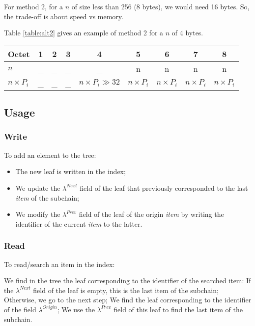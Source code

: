 \documentclass[twoside,twocolumn]{article}
\theoremstyle{definition}
\theoremstyle{remark}
\begin{document}
For method 2, for a $n$ of size less than 256 (8 bytes), we would need 16 bytes. So, the trade-off is about speed vs memory.

Table \ref{table:alt2} gives an example of method 2 for a $n$ of 4 bytes.
\begin{table*}
    \centering
    \caption{Memory management}
    \begin{tabular*}{0.75\textwidth}{l|c|c|c|c|c|c|c|c}
        Octet           &   1   &   2   &   3   &           4           &       5           &       6           &       7           &       8 \\
        \hline \hline
        $n$             &   \_  &   \_  &   \_  &           \_          &       n           &       n           &       n           &       n \\
        \hline
        $n \times P_i$  &   \_  &   \_  &   \_  & $n \times P_i \gg 32$ & $n \times P_i$    & $n \times P_i$    & $n \times P_i$    & $n \times P_i$
        \label{table:alt2}
    \end{tabular*}
\end{table*}

\subsection{Usage}

\subsubsection{Write}

To add an element to the tree:
\begin{itemize}
    \item The new leaf is written in the index;
    \item We update the $\lambda^{Next}$ field of the leaf that previously corresponded to the last \emph{item} of the subchain;
    \item We modify the $\lambda^{Prev}$ field of the leaf of the origin \emph{item} by writing the identifier of the current \emph{item} to the 
        latter.
\end{itemize}

\subsubsection{Read}

To read/search an item in the index:
\begin{outline}
    \1 We find in the tree the leaf corresponding to the identifier of the searched item:
        \2 If the $\lambda^{Next}$ field of the leaf is empty, this is the last item of the subchain;
        \2 Otherwise, we go to the next step;
    \1 We find the leaf corresponding to the identifier of the field $\lambda^{Origin}$;
    \1 We use the $\lambda^{Prev}$ field of this leaf to find the last item of the subchain.
\end{outline}
\end{document}
